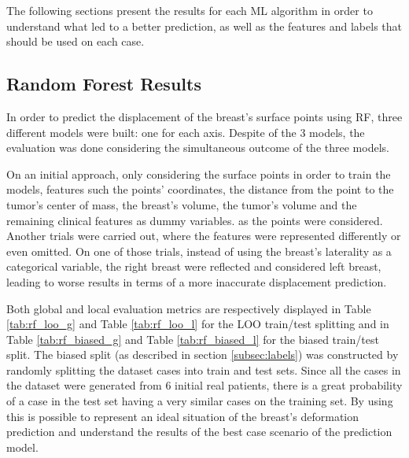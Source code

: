 The following sections present the results for each ML algorithm in order to understand what led to a better prediction, as well as the features and labels that should be used on each case.

\subsection{Random Forest Results} \label{subsec:rf_results}

In order to predict the displacement of the breast's surface points using RF, three different models were built: one for each axis. Despite of the 3 models, the evaluation was done considering the simultaneous outcome of the three models.

On an initial approach, only considering the surface points in order to train the models, features such the points' coordinates, the distance from the point to the tumor's center of mass, the breast's volume, the tumor's volume and the remaining clinical features as dummy variables. as the points were considered. Another trials were carried out, where the features were represented differently or even omitted. On one of those trials, instead of using the breast's laterality as a categorical variable, the right breast were reflected and considered left breast, leading to worse results in terms of a more inaccurate displacement prediction.

Both global and local evaluation metrics are respectively displayed in Table \ref{tab:rf_loo_g} and Table \ref{tab:rf_loo_l} for the LOO train/test splitting and in Table \ref{tab:rf_biased_g} and Table \ref{tab:rf_biased_l} for the biased train/test split. The biased split (as described in section \ref{subsec:labels}) was constructed by randomly splitting the dataset cases into train and test sets. Since all the cases in the dataset were generated from 6 initial real patients, there is a great probability of a case in the test set having a very similar cases on the training set. By using this is possible to represent an ideal situation of the breast's deformation prediction and understand the results of the best case scenario of the prediction model.


